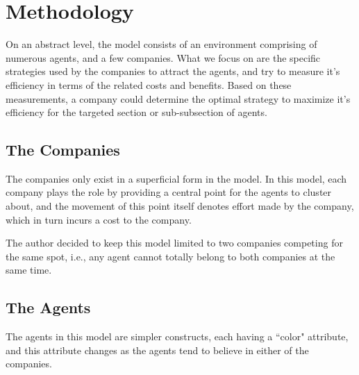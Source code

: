 
\chapter{Methodology} %

\label{Chapter3} %


On an abstract level, the model consists of an environment comprising of numerous agents, and a few companies. What we focus on are the specific strategies used by the companies to attract the agents, and try to measure it's efficiency in terms of the related costs and benefits. Based on these measurements, a company could determine the optimal strategy to maximize it's efficiency for the targeted section or sub-subsection of agents.


\section{The Companies}

The companies only exist in a superficial form in the model. In this model, each company plays the role by providing a central point for the agents to cluster about, and the movement of this point itself denotes effort made by the company, which in turn incurs a cost to the company.

The author decided to keep this model limited to two companies competing for the same spot, i.e., any agent cannot totally belong to both companies at the same time. 


\section{The Agents}

The agents in this model are simpler constructs, each  having a ``color" attribute, and this attribute changes as the agents tend to believe in either of the companies.

